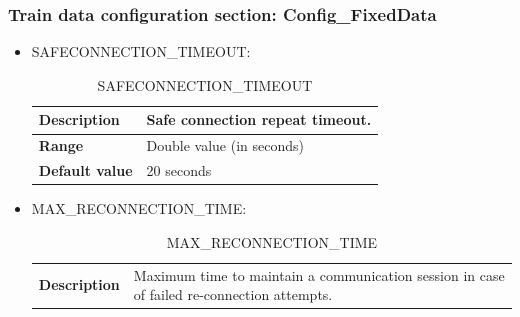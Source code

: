 \documentclass{template/openetcs}
\begin{document}
\subsubsection{Train data configuration section: Config\_FixedData}
	\begin{itemize}
			\item SAFECONNECTION\_TIMEOUT:
											
			\begin{longtable}{|l|l|}
				\caption{SAFECONNECTION\_TIMEOUT}\\ 
				\hline
				
					\begin{minipage}[t]{0.22\linewidth} \textbf{Description}	\end{minipage} 
				&	\begin{minipage}[t]{0.78\linewidth} Safe connection repeat timeout. \end{minipage} \\
				
				\hline
																																									
					\begin{minipage}[t]{0.22\linewidth} \textbf{Range}	\end{minipage} 
				&	\begin{minipage}[t]{0.78\linewidth} Double value (in seconds) \end{minipage} \\
				
				\hline
				
					\begin{minipage}[t]{0.22\linewidth} \textbf{Default value}	\end{minipage} 
				&	\begin{minipage}[t]{0.78\linewidth} 20 seconds \end{minipage} \\
				
				\hline
			\end{longtable}	
			\item MAX\_RECONNECTION\_TIME:
											
			\begin{longtable}{|l|l|}
				\caption{MAX\_RECONNECTION\_TIME}\\ 
				\hline
				
					\begin{minipage}[t]{0.22\linewidth} \textbf{Description}	\end{minipage} 
				&	\begin{minipage}[t]{0.78\linewidth} Maximum time to maintain a communication session in case of failed re-connection attempts. \end{minipage} \\
				

\end{longtable}
\end{itemize}
\end{document}
